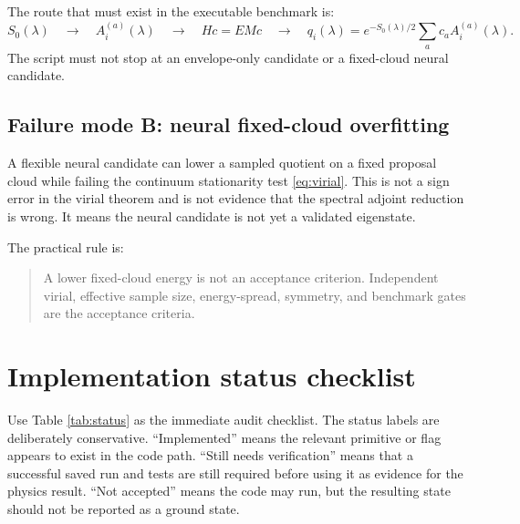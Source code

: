 \documentclass[11pt]{article}
\begin{document}
The route that must exist in the executable benchmark is:
\begin{equation}
S_0(\lambda)
\quad\longrightarrow\quad
A_i^{(a)}(\lambda)
\quad\longrightarrow\quad
Hc=EMc
\quad\longrightarrow\quad
q_i(\lambda)=e^{-S_0(\lambda)/2}\sum_a c_a A_i^{(a)}(\lambda).
\end{equation}
The script must not stop at an envelope-only candidate or a fixed-cloud neural candidate.

\subsection{Failure mode B: neural fixed-cloud overfitting}

A flexible neural candidate can lower a sampled quotient on a fixed proposal cloud while failing the continuum stationarity test \eqref{eq:virial}. This is not a sign error in the virial theorem and is not evidence that the spectral adjoint reduction is wrong. It means the neural candidate is not yet a validated eigenstate.

The practical rule is:
\begin{quote}
A lower fixed-cloud energy is not an acceptance criterion. Independent virial, effective sample size, energy-spread, symmetry, and benchmark gates are the acceptance criteria.
\end{quote}

\section{Implementation status checklist}

Use Table \ref{tab:status} as the immediate audit checklist. The status labels are deliberately conservative. ``Implemented'' means the relevant primitive or flag appears to exist in the code path. ``Still needs verification'' means that a successful saved run and tests are still required before using it as evidence for the physics result. ``Not accepted'' means the code may run, but the resulting state should not be reported as a ground state.
\end{document}
